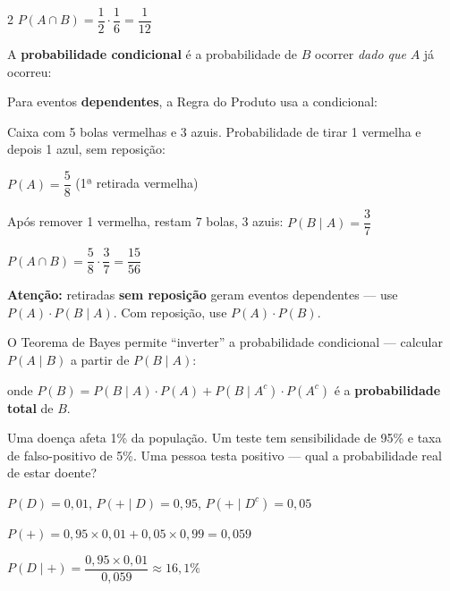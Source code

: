 \documentclass[12pt]{article}
\begin{document}
\begin{multicols}{2}
$P(A \cap B) = \dfrac{1}{2} \cdot \dfrac{1}{6} = \dfrac{1}{12}$


A \textbf{probabilidade condicional} é a probabilidade de $B$ ocorrer \textit{dado que} $A$ já ocorreu:


Para eventos \textbf{dependentes}, a Regra do Produto usa a condicional:



Caixa com 5 bolas vermelhas e 3 azuis. Probabilidade de tirar 1 vermelha e depois 1 azul, sem reposição:

$P(A) = \dfrac{5}{8}$ (1ª retirada vermelha)
\vspace{5px}

Após remover 1 vermelha, restam 7 bolas, 3 azuis: $P(B \mid A) = \dfrac{3}{7}$
\vspace{5px}

$P(A \cap B) = \dfrac{5}{8} \cdot \dfrac{3}{7} = \dfrac{15}{56}$

\vspace{4px}
\textbf{Atenção:} retiradas \textbf{sem reposição} geram eventos dependentes — use $P(A) \cdot P(B \mid A)$. Com reposição, use $P(A) \cdot P(B)$.


O Teorema de Bayes permite ``inverter'' a probabilidade condicional — calcular $P(A \mid B)$ a partir de $P(B \mid A)$:


onde $P(B) = P(B \mid A)\cdot P(A) + P(B \mid A^c)\cdot P(A^c)$ é a \textbf{probabilidade total} de $B$.


Uma doença afeta 1\% da população. Um teste tem sensibilidade de 95\% e taxa de falso-positivo de 5\%. Uma pessoa testa positivo — qual a probabilidade real de estar doente?

$P(D) = 0{,}01$, \quad $P(+\mid D) = 0{,}95$, \quad $P(+\mid D^c) = 0{,}05$
\vspace{5px}

$P(+) = 0{,}95\times 0{,}01 + 0{,}05\times 0{,}99 = 0{,}059$
\vspace{5px}

$P(D \mid +) = \dfrac{0{,}95 \times 0{,}01}{0{,}059} \approx 16{,}1\%$


\end{multicols}
\end{document}

